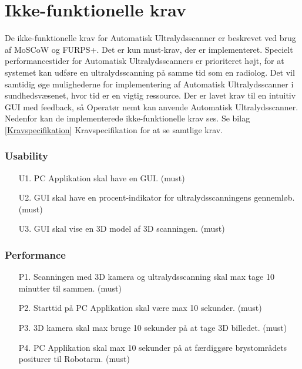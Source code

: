 \section{Ikke-funktionelle krav}
De ikke-funktionelle krav for Automatisk Ultralydsscanner er beskrevet ved brug af MoSCoW og FURPS+. Det er kun must-krav, der er implementeret. Specielt performancestider for Automatisk Ultralydsscanners er prioriteret højt, for at systemet kan udføre en ultralydsscanning på samme tid som en radiolog. Det vil samtidig øge mulighederne for implementering af Automatisk Ultralydsscanner i sundhedsvæsenet, hvor tid er en vigtig ressource. Der er lavet krav til en intuitiv GUI med feedback, så Operatør nemt kan anvende Automatisk Ultralydsscanner. Nedenfor kan de implementerede ikke-funktionelle krav ses. Se bilag \ref{Kravspecifikation} Kravspecifikation for at se samtlige krav. 

\subsubsection{Usability}
\begin{itemize}
    \item[U1.] PC Applikation skal have en GUI. (must)
    \item[U2.] GUI skal have en procent-indikator for ultralydsscanningens gennemløb. (must)
	\item[U3.] GUI skal vise en 3D model af 3D scanningen. (must)
\end{itemize}

\subsubsection{Performance}
\begin{itemize}
    \item[P1.] Scanningen med 3D kamera og ultralydsscanning skal max tage 10 minutter til sammen. (must) 
    \item[P2.] Starttid på PC Applikation skal være max 10 sekunder. (must)
    \item[P3.] 3D kamera skal max bruge 10 sekunder på at tage 3D billedet. (must)
    \item[P4.] PC Applikation skal max 10 sekunder på at færdiggøre brystområdets positurer til Robotarm. (must)
\end{itemize}

